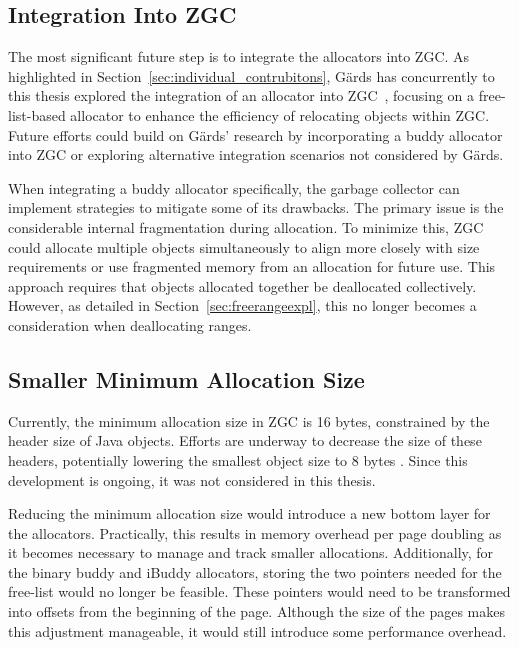 \subsection{Integration Into ZGC} \label{sec:futureworkZ}

The most significant future step is to integrate the allocators into ZGC. As highlighted in Section~\ref{sec:individual_contrubitons}, Gärds has concurrently to this thesis explored the integration of an allocator into ZGC~\cite{niclas}, focusing on a free-list-based allocator to enhance the efficiency of relocating objects within ZGC. Future efforts could build on Gärds' research by incorporating a buddy allocator into ZGC or exploring alternative integration scenarios not considered by Gärds.

When integrating a buddy allocator specifically, the garbage collector can implement strategies to mitigate some of its drawbacks. The primary issue is the considerable internal fragmentation during allocation. To minimize this, ZGC could allocate multiple objects simultaneously to align more closely with size requirements or use fragmented memory from an allocation for future use. This approach requires that objects allocated together be deallocated collectively. However, as detailed in Section~\ref{sec:freerangeexpl}, this no longer becomes a consideration when deallocating ranges.

\subsection{Smaller Minimum Allocation Size} \label{sec:futureworkLiliput}
Currently, the minimum allocation size in ZGC is 16 bytes, constrained by the header size of Java objects. Efforts are underway to decrease the size of these headers, potentially lowering the smallest object size to 8 bytes \cite{liliput}. Since this development is ongoing, it was not considered in this thesis.

Reducing the minimum allocation size would introduce a new bottom layer for the allocators. Practically, this results in memory overhead per page doubling as it becomes necessary to manage and track smaller allocations. Additionally, for the binary buddy and iBuddy allocators, storing the two pointers needed for the free-list would no longer be feasible. These pointers would need to be transformed into offsets from the beginning of the page. Although the size of the pages makes this adjustment manageable, it would still introduce some performance overhead.

